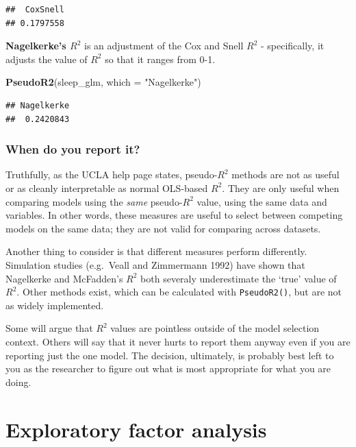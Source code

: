\documentclass[
]{book}
\newenvironment{Shaded}{\begin{snugshade}}{\end{snugshade}}
\newcommand{\AttributeTok}[1]{\textcolor[rgb]{0.13,0.29,0.53}{#1}}
\newcommand{\FunctionTok}[1]{\textcolor[rgb]{0.13,0.29,0.53}{\textbf{#1}}}
\newcommand{\NormalTok}[1]{#1}
\newcommand{\StringTok}[1]{\textcolor[rgb]{0.31,0.60,0.02}{#1}}
\begin{document}
\begin{verbatim}
##  CoxSnell 
## 0.1797558
\end{verbatim}

\textbf{Nagelkerke's \(R^2\)} is an adjustment of the Cox and Snell \(R^2\) - specifically, it adjusts the value of \(R^2\) so that it ranges from 0-1.

\begin{Shaded}
\begin{Highlighting}[]
\FunctionTok{PseudoR2}\NormalTok{(sleep\_glm, }\AttributeTok{which =} \StringTok{"Nagelkerke"}\NormalTok{)}
\end{Highlighting}
\end{Shaded}

\begin{verbatim}
## Nagelkerke 
##  0.2420843
\end{verbatim}

\hypertarget{when-do-you-report-it}{%
\subsection{When do you report it?}\label{when-do-you-report-it}}

Truthfully, as the UCLA help page states, pseudo-\(R^2\) methods are not as useful or as cleanly interpretable as normal OLS-based \(R^2\). They are only useful when comparing models using the \emph{same} pseudo-\(R^2\) value, using the same data and variables. In other words, these measures are useful to select between competing models on the same data; they are not valid for comparing across datasets.

Another thing to consider is that different measures perform differently. Simulation studies (e.g.~Veall and Zimmermann 1992) have shown that Nagelkerke and McFadden's \(R^2\) both severaly underestimate the `true' value of \(R^2\). Other methods exist, which can be calculated with \texttt{PseudoR2()}, but are not as widely implemented.

Some will argue that \(R^2\) values are pointless outside of the model selection context. Others will say that it never hurts to report them anyway even if you are reporting just the one model. The decision, ultimately, is probably best left to you as the researcher to figure out what is most appropriate for what you are doing.

\hypertarget{exploratory-factor-analysis}{%
\chapter{Exploratory factor analysis}\label{exploratory-factor-analysis}}
\end{document}
